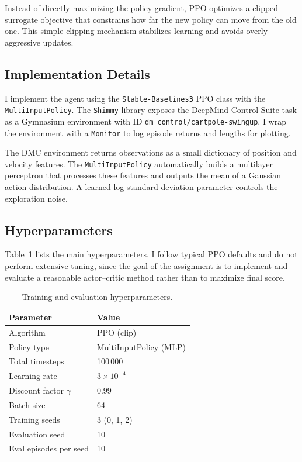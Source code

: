 \documentclass[a4paper, twocolumn, 10pt]{article}
\begin{document}
Instead of directly maximizing the policy gradient, PPO optimizes a clipped surrogate objective that constrains how far the new policy can move from the old one. This simple clipping mechanism stabilizes learning and avoids overly aggressive updates.

\subsection{Implementation Details}
I implement the agent using the \texttt{Stable-Baselines3} PPO class with the \texttt{MultiInputPolicy}. The \texttt{Shimmy} library exposes the DeepMind Control Suite task as a Gymnasium environment with ID \texttt{dm\_control/cartpole-swingup}. I wrap the environment with a \texttt{Monitor} to log episode returns and lengths for plotting.

The DMC environment returns observations as a small dictionary of position and velocity features. The \texttt{MultiInputPolicy} automatically builds a multilayer perceptron that processes these features and outputs the mean of a Gaussian action distribution. A learned log-standard-deviation parameter controls the exploration noise.

\subsection{Hyperparameters}
Table~\ref{tab:hyperparams} lists the main hyperparameters. I follow typical PPO defaults and do not perform extensive tuning, since the goal of the assignment is to implement and evaluate a reasonable actor--critic method rather than to maximize final score.

\begin{table}[h]
\centering
\caption{Training and evaluation hyperparameters.}
\label{tab:hyperparams}
\begin{tabular}{ll}
\toprule
\textbf{Parameter} & \textbf{Value} \\
\midrule
Algorithm & PPO (clip) \\
Policy type & MultiInputPolicy (MLP) \\
Total timesteps & 100\,000 \\
Learning rate & $3 \times 10^{-4}$ \\
Discount factor $\gamma$ & $0.99$ \\
Batch size & 64 \\
Training seeds & 3 (0, 1, 2) \\
Evaluation seed & 10 \\
Eval episodes per seed & 10 \\
\bottomrule
\end{tabular}
\end{table}
\end{document}
